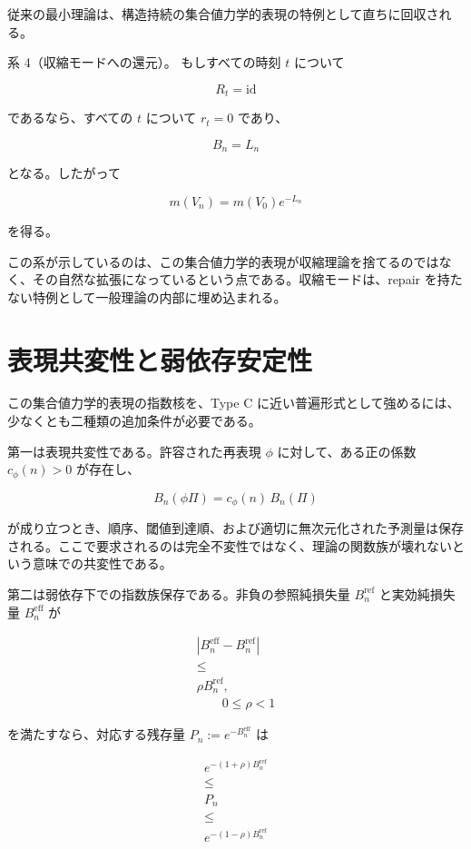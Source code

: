 \documentclass[12pt,a4paper]{article}
\begin{document}
従来の最小理論は、構造持続の集合値力学的表現の特例として直ちに回収される。

系 4（収縮モードへの還元）。 もしすべての時刻 \(t\) について

\[
R_{t} = \mathrm{id}
\]

であるなら、すべての \(t\) について \(r_{t} = 0\) であり、

\[
B_{n} = L_{n}
\]

となる。したがって

\[
m(V_{n}) = m(V_0) e^{-L_{n}}
\]

を得る。

この系が示しているのは、この集合値力学的表現が収縮理論を捨てるのではなく、その自然な拡張になっているという点である。収縮モードは、repair を持たない特例として一般理論の内部に埋め込まれる。

\section{表現共変性と弱依存安定性}\label{ux8868ux73feux5171ux5909ux6027ux3068ux5f31ux4f9dux5b58ux5b89ux5b9aux6027}

この集合値力学的表現の指数核を、Type C に近い普遍形式として強めるには、少なくとも二種類の追加条件が必要である。

第一は表現共変性である。許容された再表現 \(\phi\) に対して、ある正の係数 \(c_\phi(n) > 0\) が存在し、

\[
B_{n}(\phi \Pi) = c_\phi(n)\, B_{n}(\Pi)
\]

が成り立つとき、順序、閾値到達順、および適切に無次元化された予測量は保存される。ここで要求されるのは完全不変性ではなく、理論の関数族が壊れないという意味での共変性である。

第二は弱依存下での指数族保存である。非負の参照純損失量 \(B_{n}^{\mathrm{ref}}\) と実効純損失量 \(B_{n}^{\mathrm{eff}}\) が

\[
\begin{aligned}
|B_{n}^{\mathrm{eff}} - B_{n}^{\mathrm{ref}}| \\
\le \\
\rho B_{n}^{\mathrm{ref}}, \\
\qquad 0 \le \rho < 1
\end{aligned}
\]

を満たすなら、対応する残存量 \(P_{n} := e^{-B_{n}^{\mathrm{eff}}}\) は

\[
\begin{aligned}
e^{-(1+\rho)B_{n}^{\mathrm{ref}}} \\
\le \\
P_{n} \\
\le \\
e^{-(1-\rho)B_{n}^{\mathrm{ref}}}
\end{aligned}
\]
\end{document}
